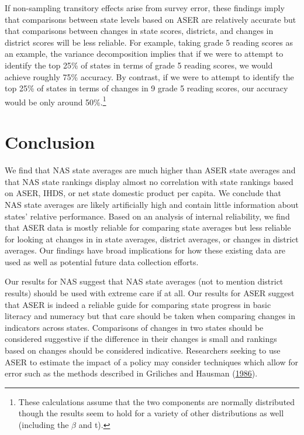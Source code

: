 \documentclass[
  11pt,
]{article}
\begin{document}
If non-sampling transitory effects arise from survey error, these findings imply that comparisons between state levels based on ASER are relatively accurate but that comparisons between changes in state scores, districts, and changes in district scores will be less reliable. For example, taking grade 5 reading scores as an example, the variance decomposition implies that if we were to attempt to identify the top 25\% of states in terms of grade 5 reading scores, we would achieve roughly 75\% accuracy. By contrast, if we were to attempt to identify the top 25\% of states in terms of changes in
9 grade 5 reading scores, our accuracy would be only around 50\%.\footnote{These calculations assume that the two components are normally distributed though the results seem to hold for a variety of other distributions as well (including the \(\beta\) and t).}

\hypertarget{conclusion}{%
\section{Conclusion}\label{conclusion}}

We find that NAS state averages are much higher than ASER state averages and that NAS state rankings display almost no correlation with state rankings based on ASER, IHDS, or net state domestic product per capita. We conclude that NAS state averages are likely artificially high and contain little information about states' relative performance. Based on an analysis of internal reliability, we find that ASER data is mostly reliable for comparing state averages but less reliable for looking at changes in in state averages, district averages, or changes in district averages. Our findings have broad implications for how these existing data are used as well as potential future data collection efforts.

Our results for NAS suggest that NAS state averages (not to mention district results) should be used with extreme care if at all. Our results for ASER suggest that ASER is indeed a reliable guide for comparing state progress in basic literacy and numeracy but that care should be taken when comparing changes in indicators across states. Comparisons of changes in two states should be considered suggestive if the difference in their changes is small and rankings based on changes should be considered indicative. Researchers seeking to use ASER to estimate the impact of a policy may consider techniques which allow for error such as the methods described in Griliches and Hausman (\protect\hyperlink{ref-griliches1986errors}{1986}).
\end{document}
